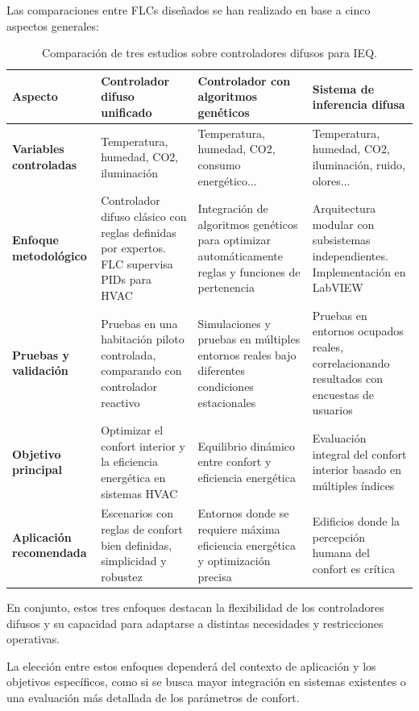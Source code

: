 Las comparaciones entre FLCs diseñados se han realizado en base a cinco aspectos generales:

\begin{table}[H]
	\centering
	\renewcommand{\arraystretch}{1.5}
	\begin{tabular}{|p{2.5cm}|p{4cm}|p{4cm}|p{4cm}|}
		\hline
		\rowcolor{lightgray}
		\textbf{Aspecto} & \textbf{Controlador difuso unificado} & \textbf{Controlador con algoritmos genéticos} & \textbf{Sistema de inferencia difusa} \\ \hline
		
		\textbf{Variables controladas} & 
		Temperatura, humedad, CO2, iluminación & 
		Temperatura, humedad, CO2, consumo energético... & 
		Temperatura, humedad, CO2, iluminación, ruido, olores... \\ \hline
		
		\textbf{Enfoque metodológico} & 
		Controlador difuso clásico con reglas definidas por expertos. FLC supervisa PIDs para HVAC & 
		Integración de algoritmos genéticos para optimizar automáticamente reglas y funciones de pertenencia & 
		Arquitectura modular con subsistemas independientes. Implementación en LabVIEW \\ \hline
		
		\textbf{Pruebas y validación} & 
		Pruebas en una habitación piloto controlada, comparando con controlador reactivo & 
		Simulaciones y pruebas en múltiples entornos reales bajo diferentes condiciones estacionales & 
		Pruebas en entornos ocupados reales, correlacionando resultados con encuestas de usuarios \\ \hline
		
		\textbf{Objetivo principal} & 
		Optimizar el confort interior y la eficiencia energética en sistemas HVAC & 
		Equilibrio dinámico entre confort y eficiencia energética & 
		Evaluación integral del confort interior basado en múltiples índices \\ \hline
		
		\textbf{Aplicación recomendada} & 
		Escenarios con reglas de confort bien definidas, simplicidad y robustez & 
		Entornos donde se requiere máxima eficiencia energética y optimización precisa & 
		Edificios donde la percepción humana del confort es crítica \\ \hline
	\end{tabular}
	\caption{Comparación de tres estudios sobre controladores difusos para IEQ.}
	\label{tab:comparacion}
\end{table}

En conjunto, estos tres enfoques destacan la flexibilidad de los controladores difusos y su capacidad para adaptarse a distintas necesidades y restricciones operativas.

La elección entre estos enfoques dependerá del contexto de aplicación y los objetivos específicos, como si se busca mayor integración en sistemas existentes o una evaluación más detallada de los parámetros de confort.